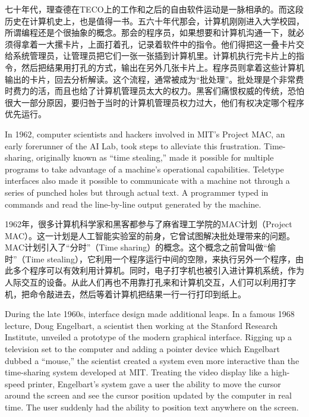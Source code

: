 \ifdefined\chs
七十年代，理查德在TECO上的工作和之后的自由软件运动是一脉相承的。而这段历史在计算机史上，也是值得一书。五六十年代那会，计算机刚刚进入大学校园，所谓编程还是个很抽象的概念。那会的程序员，如果想要和计算机沟通一下，就必须得拿着一大摞卡片，上面打着孔，记录着软件中的指令。他们得把这一叠卡片交给系统管理员，让管理员把它们一张一张插到计算机里。计算机执行完卡片上的指令，然后把结果用打孔的方式，输出在另外几张卡片上。程序员则拿着这些计算机输出的卡片，回去分析解读。这个流程，通常被成为“批处理”。批处理是个非常费时费力的活，而且也给了计算机管理员太大的权力。黑客们痛恨权威的传统，恐怕很大一部分原因，要归咎于当时的计算机管理员权力过大，他们有权决定哪个程序优先运行。
\fi

\ifdefined\eng
In 1962, computer scientists and hackers involved in MIT's Project MAC, an early forerunner of the AI Lab, took steps to alleviate this frustration. Time-sharing, originally known as ``time stealing,'' made it possible for multiple programs to take advantage of a machine's operational capabilities. Teletype interfaces also made it possible to communicate with a machine not through a series of punched holes but through actual text. A programmer typed in commands and read the line-by-line output generated by the machine.
\fi

\ifdefined\chs
1962年，很多计算机科学家和黑客都参与了麻省理工学院的MAC计划（Project MAC）。这一计划是人工智能实验室的前身，它曾试图解决批处理带来的问题。MAC计划引入了“分时”（Time sharing）的概念。这个概念之前曾叫做“偷时”（Time stealing），它利用一个程序运行中间的空隙，来执行另外一个程序，由此多个程序可以有效利用计算机。同时，电子打字机也被引入进计算机系统，作为人际交互的设备。从此人们再也不用靠打孔来和计算机交互，人们可以利用打字机，把命令敲进去，然后等着计算机把结果一行一行打印到纸上。
\fi

\ifdefined\eng
During the late 1960s, interface design made additional leaps. In a famous 1968 lecture, Doug Engelbart, a scientist then working at the Stanford Research Institute, unveiled a prototype of the modern graphical interface. Rigging up a television set to the computer and adding a pointer device which Engelbart dubbed a ``mouse,'' the scientist created a system even more interactive than the time-sharing system developed at MIT. Treating the video display like a high-speed printer, Engelbart's system gave a user the ability to move the cursor around the screen and see the cursor position updated by the computer in real time. The user suddenly had the ability to position text anywhere on the screen.
\fi

